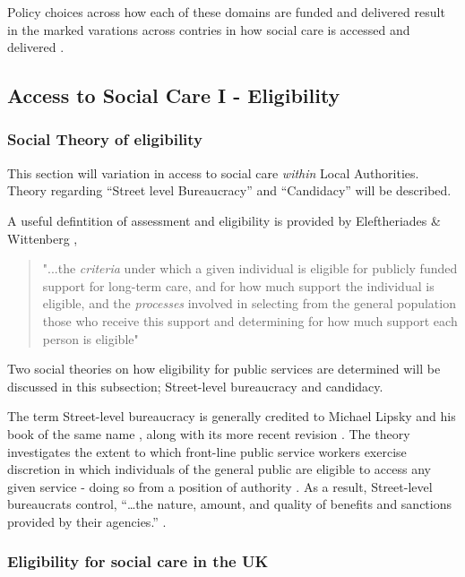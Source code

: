 \documentclass[12pt,]{report}
\begin{document}
Policy choices across how each of these domains are funded and delivered
result in the marked varations across contries in how social care is
accessed and delivered \citep{RN414}.

\subsection{Access to Social Care I - Eligibility}\label{subsec:access-sc-eligibility}

\subsubsection{Social Theory of eligibility}\label{subsubsec:eligibility-theory}

This section will variation in access to social care \emph{within} Local
Authorities. Theory regarding ``Street level Bureaucracy'' and
``Candidacy'' will be described.

A useful defintition of assessment and eligibility is provided by
Eleftheriades \& Wittenberg \citeyearpar[pp.2]{RN407},

\begin{quotation}
"...the \emph{criteria} under which a given individual is eligible for publicly funded support for long-term care, and for how much support the individual is eligible, and the \emph{processes} involved in selecting from the general population those who receive this support and determining for how much support each person is eligible"
\end{quotation}

Two social theories on how eligibility for public services are
determined will be discussed in this subsection; Street-level
bureaucracy and candidacy.

The term Street-level bureaucracy is generally credited to Michael
Lipsky and his book of the same name \citeyearpar{RN174}, along with its
more recent revision \citep{RN430}. The theory investigates the extent
to which front-line public service workers exercise discretion in which
individuals of the general public are eligible to access any given
service - doing so from a position of authority \citep{RN430}. As a
result, Street-level bureaucrats control, ``\ldots{}the nature, amount,
and quality of benefits and sanctions provided by their agencies.''
\citep[pp.13]{RN430}. \citep{RN428}

\subsubsection{Eligibility for social care in the UK}\label{subsubsec:eligibility-uk}
\end{document}
